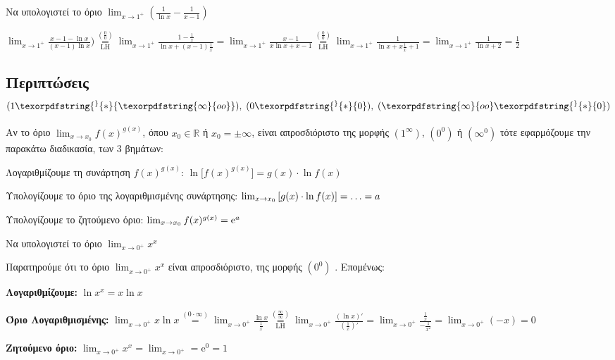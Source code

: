 \begin{example}
  Να υπολογιστεί το όριο $ \lim_{x \to 1^{+}} \left(\frac{1}{\ln{x}} -
  \frac{1}{x-1}\right) $
\end{example}
\begin{solution} 
  $\lim_{x \to 1^{+}} \frac{x-1- \ln{x}}{(x-1) \ln{x}})
  \overset{\left(\frac{0}{0}\right)}{\underset{\mathrm{LH}}{=}} \!
  \lim_{x \to 1^{+}} \frac{1- \frac{1}{x}}{\ln{x} + (x-1) \frac{1}{x}} = \!
  \lim_{x \to 1^{+}} \frac{x-1}{ x \ln{x} + x-1} 
  \overset{\left(\frac{0}{0}\right)}{\underset{\mathrm{LH}}{=}} \!
  \lim_{x \to 1^{+}} \frac{1}{\ln{x} +x \frac{1}{x}+1} =
  \lim_{x \to 1^{+}} \frac{1}{\ln{x}+2} = \frac{1}{2}$ 
\end{solution}


\subsection{Περιπτώσεις $ (1\texorpdfstring{^}{*}{\texorpdfstring{\infty}{oo}}), \;
(0\texorpdfstring{^}{*}{0}), \; (\texorpdfstring{\infty}{oo}\texorpdfstring{^}{*}{0}) $}

Αν το όριο $ \lim_{x \to x_{0}} f(x)^{g(x)} $, όπου $ x_{0} \in
\mathbb{R} $ ή $ x_{0}= \pm \infty $, είναι απροσδιόριστο της μορφής 
$ (1^{\infty}) $, $ (0^0) $ ή $ (\infty^{0}) $ 
τότε εφαρμόζουμε την παρακάτω διαδικασία, των 3 βημάτων:
\begin{myitemize}
  \item \textcolor{Col1}{Λογαριθμίζουμε τη συνάρτηση $ f(x)^{g(x)} $:} $ \ln{\bigl[f(x)^{g(x)}\bigr]} = g(x)\cdot \ln{f(x)} $
  \item \textcolor{Col1}{Υπολογίζουμε το όριο της λογαριθμισμένης συνάρτησης:} 
    $ \lim_{\smash{x \to x_{0}}} \left[g(x)\cdot \ln{f(x)}\right] = \ldots = a $
  \item \textcolor{Col1}{Υπολογίζουμε το ζητούμενο όριο:} 
    $ \lim_{x \to x_{0}} \smash{f(x)^{g(x)}} = \mathrm{e}^{a} $
\end{myitemize}

\begin{example}
  Να υπολογιστεί το όριο $ \lim_{x \to 0^{+}} x^{x} $
\end{example}
\begin{solution}
  Παρατηρούμε ότι το όριο $ \lim_{x \to 0^{+}} x^{x} $ είναι απροσδιόριστο, της μορφής 
  $( 0^{0}) $ . Επομένως:
  \begin{myitemize}
    \item \textbf{Λογαριθμίζουμε:} $ \ln{x^{x}} = x \ln{x} $
    \item \textbf{Όριο Λογαριθμισμένης:} $ \lim_{x \to 0^{+}} x \ln{x} \overset{(0 \cdot
      \infty)}{=} \lim_{x \to 0^{+}} \frac{\ln{x}}{\frac{1}{x}}
      \overset{\left(\frac{\infty}{\infty}\right)}{\underset{\mathrm{LH}}{=}}  
      \lim_{x \to 0^{+}} \frac{(\ln{x} )'}{(\frac{1}{x} )'} = \lim_{x \to 0^{+}}
      \frac{\frac{1}{x}}{- \frac{1}{x^{2}}} = \lim_{x \to 0^{+}} (-x) = 0 $
    \item \textbf{Ζητούμενο όριο:} $ \lim_{x \to 0^{+}} x^{x} = \lim_{x \to 0^{+}} = 
      \mathrm{e}^{0} = 1 $ 
  \end{myitemize}
\end{solution}

